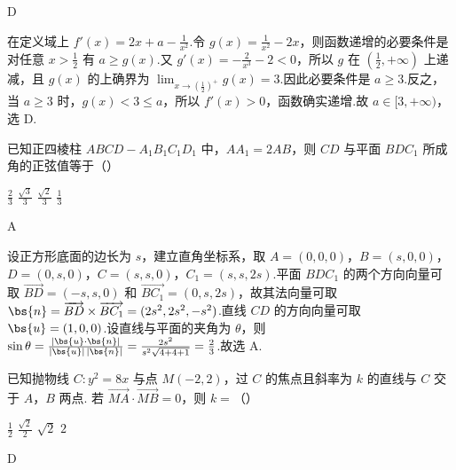 \begin{answer}
D
\end{answer}

\begin{solution}
在定义域上 \(f'(x)=2x+a-\frac{1}{x^2}\).令 \(g(x)=\frac{1}{x^2}-2x\)，则函数递增的必要条件是对任意 \(x>\frac{1}{2}\) 有 \(a\geqslant g(x)\).又 \(g'(x)=-\frac{2}{x^3}-2<0\)，所以 \(g\) 在 \(\left(\frac{1}{2},+\infty\right)\) 上递减，且 \(g(x)\) 的上确界为 \(\lim_{x\to(\frac{1}{2})^+}g(x)=3\).因此必要条件是 \(a\geqslant3\).反之，当 \(a\geqslant3\) 时，\(g(x)<3\leqslant a\)，所以 \(f'(x)>0\)，函数确实递增.故 \(a\in[3,+\infty)\)，选 D.
\end{solution}

\begin{problem}
已知正四棱柱 \(ABCD-A_1B_1C_1D_1\) 中，\(AA_1=2AB\)，则 \(CD\) 与平面 \(BDC_1\) 所成角的正弦值等于（\quad）

\choices
    {\(\frac{2}{3}\)}
    {\(\frac{\sqrt{3}}{3}\)}
    {\(\frac{\sqrt{2}}{3}\)}
    {\(\frac{1}{3}\)}
\end{problem}

\begin{answer}
A
\end{answer}

\begin{solution}
设正方形底面的边长为 \(s\)，建立直角坐标系，取 \(A=(0,0,0)\)，\(B=(s,0,0)\)，\(D=(0,s,0)\)，\(C=(s,s,0)\)，\(C_1=(s,s,2s)\).平面 \(BDC_1\) 的两个方向向量可取 \(\overrightarrow{BD}=(-s,s,0)\) 和 \(\overrightarrow{BC_1}=(0,s,2s)\)，故其法向量可取 \(\bs{n}=\overrightarrow{BD}\times\overrightarrow{BC_1}=(2s^2,2s^2,-s^2)\).直线 \(CD\) 的方向向量可取 \(\bs{u}=(1,0,0)\).设直线与平面的夹角为 \(\theta\)，则 \(\sin\theta=\frac{|\bs{u}\cdot\bs{n}|}{|\bs{u}|\,|\bs{n}|}=\frac{2s^2}{s^2\sqrt{4+4+1}}=\frac{2}{3}\).故选 A.
\end{solution}

\begin{problem}
已知抛物线 \(C:y^2=8x\) 与点 \(M(-2,2)\)，过 \(C\) 的焦点且斜率为 \(k\) 的直线与 \(C\) 交于 \(A\)，\(B\) 两点. 若 \(\overrightarrow{MA}\cdot\overrightarrow{MB}=0\)，则 \(k=\)（\quad）

\choices
    {\(\frac{1}{2}\)}
    {\(\frac{\sqrt{2}}{2}\)}
    {\(\sqrt{2}\)}
    {\(2\)}
\end{problem}

\begin{answer}
D
\end{answer}

